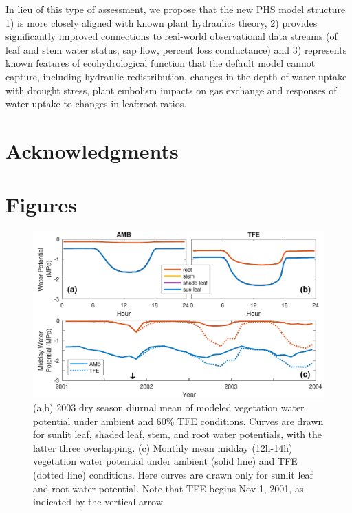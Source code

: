 \documentclass[draft,linenumbers]{agujournal}
\begin{document}
    In lieu of this type of assessment, we propose that the new PHS model structure 1) is more closely aligned with known plant hydraulics theory, 2) provides significantly improved connections to real-world observational data streams (of leaf and stem water status, sap flow, percent loss conductance) and 3) represents known features of ecohydrological function that the default model cannot capture, including hydraulic redistribution, changes in the depth of water uptake with drought stress, plant embolism impacts on gas exchange and responses of water uptake to changes in leaf:root ratios. 
    
    

\section{Acknowledgments}

\clearpage    

\section{Figures}
  \begin{figure}[h]
     \centering
     \includegraphics[width=30pc]{../figs3/vwp.pdf}
     \caption{(a,b) 2003 dry season diurnal mean of modeled vegetation water potential under ambient and 60\% TFE conditions.
     Curves are drawn for sunlit leaf, shaded leaf, stem, and root water potentials, with the latter three overlapping.
     (c) Monthly mean midday (12h-14h) vegetation water potential under ambient (solid line) and TFE (dotted line) conditions.
     Here curves are drawn only for sunlit leaf and root water potential.
     Note that TFE begins Nov 1, 2001, as indicated by the vertical arrow. 
     }
     \label{fig:vwp}
  \end{figure}
\end{document}
